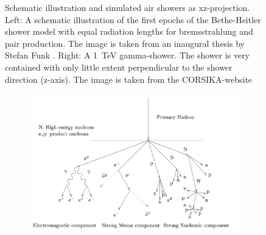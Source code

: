 \begin{figure}
\begin{subfigure}{.3\textwidth}
	\end{subfigure}
	\caption{Schematic illustration and simulated air showers as xz-projection.
		Left: A schematic illustration of the first epochs of the 
		Bethe-Heitler shower model with equal radiation lengths for
		bremsstrahlung and pair production.
		The image is taken from an inaugural thesis 
		by Stefan Funk \cite{funk_doctor}.
		Right: A \SI{1}{\tera\electronvolt} gamma-shower.
		The shower is very contained with only little extent perpendicular 
		to the shower direction (z-axis). The image is taken from 
		the CORSIKA-website \cite{corsika_showers}}
	\label{fig:gamma_shower}
\end{figure}

\begin{figure}
	\centering
	\begin{subfigure}{.7\textwidth}
  		\centering
  		\includegraphics[width=\linewidth]{images/hadron_shower_illustration.png}
	\end{subfigure}%
	\begin{subfigure}{.3\textwidth}
 		\centering

\end{subfigure}
\end{figure}
